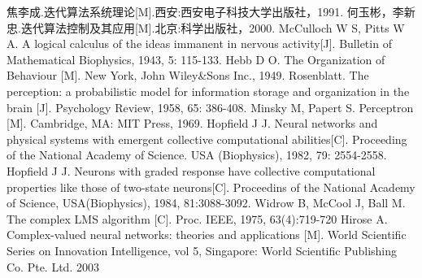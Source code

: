 \documentclass{dmuthesis}
\begin{document}
\begin{thebibliography}{99}


 焦李成.迭代算法系统理论[M].西安:西安电子科技大学出版社，1991.
 何玉彬，李新忠.迭代算法控制及其应用[M].北京:科学出版社，2000.
 McCulloch W S, Pitts W A. A logical calculus of the ideas immanent in nervous activity[J]. Bulletin of Mathematical Biophysics, 1943, 5: 115-133.
 Hebb D O. The Organization of Behaviour [M]. New York, John Wiley\&Sons Inc., 1949.
 Rosenblatt. The perception: a probabilistic model for information storage and organization in the brain [J]. Psychology Review, 1958, 65: 386-408.
 Minsky M, Papert S. Perceptron [M]. Cambridge, MA: MIT Press, 1969.
 Hopf\/ield  J  J.  Neural  networks  and  physical  systems  with  emergent  collective computational  abilities[C].  Proceeding  of the National Academy  of  Science.  USA (Biophysics), 1982, 79: 2554-2558.
 Hopf\/ield J J. Neurons with graded response have collective computational properties like those  of  two-state  neurons[C].  Proceedins  of  the  National  Academy  of  Science, USA(Biophysics), 1984, 81:3088-3092.
 Widrow B, McCool J, Ball M. The complex LMS algorithm [C]. Proc. IEEE, 1975, 63(4):719-720
 Hirose  A.  Complex-valued  neural  networks:  theories  and  applications  [M].  World Scientif\/ic Series on Innovation Intelligence, vol 5, Singapore: World Scientif\/ic Publishing Co. Pte. Ltd. 2003


\end{thebibliography}
\end{document}
